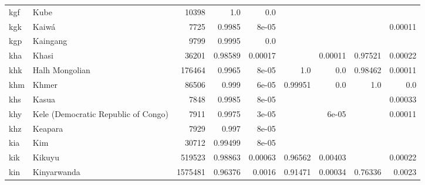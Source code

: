 \documentclass[11pt]{article}
\begin{document}
\begin{table*}[h]
{\begin{tabular}{llrrrrrrr}
kgf         & Kube         & 10398         & 1.0         & 0.0         &          &          &          &          \\

kgk         & Kaiwá         & 7725         & 0.9985         & 8e-05         &          &          &          & 0.00011         \\

kgp         & Kaingang         & 9799         & 0.9995         & 0.0         &          &          &          &          \\

kha         & Khasi         & 36201         & 0.98589         & 0.00017         &          & 0.00011         & 0.97521         & 0.00022         \\

khk         & Halh Mongolian         & 176464         & 0.9965         & 8e-05         & 1.0         & 0.0         & 0.98462         & 0.00011         \\

khm         & Khmer         & 86506         & 0.999         & 6e-05         & 0.99951         & 0.0         & 1.0         & 0.0         \\

khs         & Kasua         & 7848         & 0.9985         & 8e-05         &          &          &          & 0.00033         \\

khy         & Kele (Democratic Republic of Congo)         & 7911         & 0.9975         & 3e-05         &          & 6e-05         &          & 0.00011         \\

khz         & Keapara         & 7929         & 0.997         & 8e-05         &          &          &          &          \\

kia         & Kim         & 30712         & 0.99499         & 8e-05         &          &          &          &          \\

kik         & Kikuyu         & 519523         & 0.98863         & 0.00063         & 0.96562         & 0.00403         &          & 0.00022         \\

kin         & Kinyarwanda         & 1575481         & 0.96376         & 0.0016         & 0.91471         & 0.00034         & 0.76336         & 0.0023         \\


\end{tabular}}
\end{table*}
\end{document}
